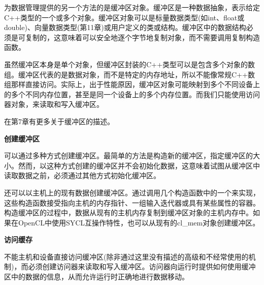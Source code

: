 为数据管理提供的另一个方法的是缓冲区对象。缓冲区是一种数据抽象，表示给定C++类型的一个或多个对象。缓冲区对象可以是标量数据类型(如int、float或double)、向量数据类型(第11章)或用户定义的类或结构。缓冲区中的数据结构必须是可复制的，这意味着可以安全地逐个字节地复制对象，而不需要调用复制构造函数。\par

虽然缓冲区本身是单个对象，但缓冲区封装的C++类型可以是包含多个对象的数组。缓冲区代表的是数据对象，而不是特定的内存地址，所以不能像常规C++数组那样直接访问。实际上，出于性能原因，缓冲区对象可能映射到多个不同设备上的多个不同内存位置，甚至是同一个设备上的多个内存位置。而我们只能使用访问器对象，来读取和写入缓冲区。\par

在第7章有更多关于缓冲区的描述。\par

\hspace*{\fill} \par %
\textbf{创建缓冲区}

可以通过多种方式创建缓冲区。最简单的方法是构造新的缓冲区，指定缓冲区的大小。然而，以这种方式创建的缓冲区并不会初始化数据，这意味着试图从缓冲区中读取数据之前，必须通过其他方式初始化缓冲区。\par

还可以以主机上的现有数据创建缓冲区。通过调用几个构造函数中的一个来实现，这些构造函数接受指向主机的内存指针、一组输入迭代器或具有某些属性的容器。构造缓冲区的过程中，数据从现有的主机内存复制到缓冲区对象的主机内存中。如果在OpenCL中使用SYCL互操作特性，也可以从现有的cl\_mem对象创建缓冲区。\par

\hspace*{\fill} \par %
\textbf{访问缓存}

不能主机和设备直接访问缓冲区(除非通过这里没有描述的高级和不经常使用的机制)，而必须创建访问器来读取和写入缓冲区。访问器向运行时提供如何使用缓冲区中的数据的信息，从而允许运行时正确地进行数据移动。\par

